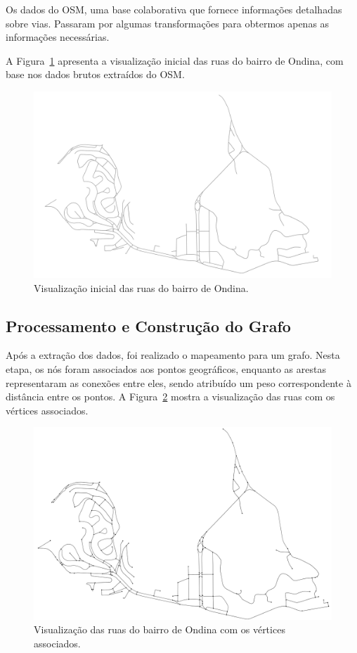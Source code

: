 \documentclass[12pt, a4paper]{report}
\begin{document}
Os dados do OSM, uma base colaborativa que fornece informações detalhadas sobre vias. Passaram por algumas transformações para obtermos apenas as informações necessárias.

A Figura~\ref{fig:ondina_ruas} apresenta a visualização inicial das ruas do bairro de Ondina, com base nos dados brutos extraídos do OSM.

\begin{figure}[H]
    \centering
    \includegraphics[width=\textwidth]{visualizacao_inicial}
    \caption{Visualização inicial das ruas do bairro de Ondina.}
    \label{fig:ondina_ruas}
\end{figure}

\subsection{Processamento e Construção do Grafo}

Após a extração dos dados, foi realizado o mapeamento para um grafo. Nesta etapa, os nós foram associados aos pontos geográficos, enquanto as arestas representaram as conexões entre eles, sendo atribuído um peso correspondente à distância entre os pontos. A Figura~\ref{fig:ondina_grafo_bruto} mostra a visualização das ruas com os vértices associados.

\begin{figure}[H]
    \centering
    \includegraphics[width=\textwidth]{ondina_grafo_bruto}
    \caption{Visualização das ruas do bairro de Ondina com os vértices associados.}
    \label{fig:ondina_grafo_bruto}
\end{figure}
\end{document}
